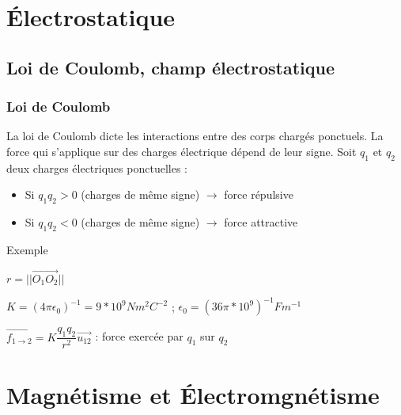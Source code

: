 \chapter{Électrostatique}
\section{Loi de Coulomb, champ électrostatique}
\subsection{Loi de Coulomb}
La loi de Coulomb dicte les interactions entre des corps chargés ponctuels. La force qui s'applique sur des charges électrique dépend de leur signe. Soit $q_1$ et $q_2$ deux charges électriques ponctuelles : 
\begin{itemize}
    \item Si $q_1 q_2>0$ (charges de même signe) $\rightarrow$ force répulsive
    \item Si $q_1 q_2<0$ (charges de même signe) $\rightarrow$ force attractive
\end{itemize}

\begin{bclogo}[logo=\bccrayon,noborder=true,barre=snake]{Exemple}
\begin{minipage}{0.3\textwidth}
\end{minipage}
\begin{minipage}{0.7\textwidth}
$r=||\overrightarrow{O_1 O_2}||$

$K=(4\pi \epsilon_0)^{-1}=9*10^9 Nm^2C^{-2}$ ; $\epsilon_0 = (36\pi*10^9)^{-1} Fm^{-1}$

\textbf{$\overrightarrow{f_{1\rightarrow2}}=K\dfrac{q_1 q_2}{r^2}\overrightarrow{u_{12}}$} : force exercée par $q_1$ sur $q_2$
\end{minipage}
\end{bclogo}

\chapter{Magnétisme et Électromgnétisme}



